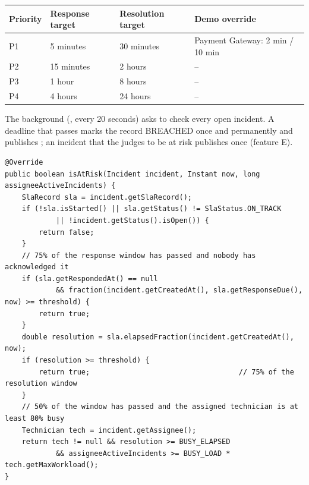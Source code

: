 \begin{tabularx}{\linewidth}{@{}L{2cm}L{3.2cm}L{3.4cm}Y@{}}
\toprule
\textbf{Priority} & \textbf{Response target} & \textbf{Resolution target} & \textbf{Demo override} \\
\midrule
P1 & 5 minutes & 30 minutes & Payment Gateway: 2 min / 10 min \\
P2 & 15 minutes & 2 hours & -- \\
P3 & 1 hour & 8 hours & -- \\
P4 & 4 hours & 24 hours & -- \\
\bottomrule
\end{tabularx}

The background  (, every 20 seconds) asks  to check every open incident. A deadline that passes marks the record BREACHED once and permanently and publishes ; an incident that the  judges to be at risk publishes  once (feature E).

\begin{lstlisting}[caption={ThresholdSlaRiskEvaluator: when is an incident at risk?}]
@Override
public boolean isAtRisk(Incident incident, Instant now, long assigneeActiveIncidents) {
    SlaRecord sla = incident.getSlaRecord();
    if (!sla.isStarted() || sla.getStatus() != SlaStatus.ON_TRACK
            || !incident.getStatus().isOpen()) {
        return false;
    }
    // 75% of the response window has passed and nobody has acknowledged it
    if (sla.getRespondedAt() == null
            && fraction(incident.getCreatedAt(), sla.getResponseDue(), now) >= threshold) {
        return true;
    }
    double resolution = sla.elapsedFraction(incident.getCreatedAt(), now);
    if (resolution >= threshold) {
        return true;                                   // 75% of the resolution window
    }
    // 50% of the window has passed and the assigned technician is at least 80% busy
    Technician tech = incident.getAssignee();
    return tech != null && resolution >= BUSY_ELAPSED
            && assigneeActiveIncidents >= BUSY_LOAD * tech.getMaxWorkload();
}
\end{lstlisting}

